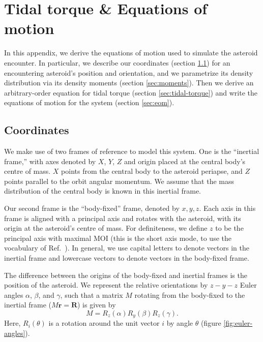 \appendix

\section{Tidal torque \& Equations of motion}
\label{app:eom}

In this appendix, we derive the equations of motion used to simulate the asteroid encounter. In particular, we describe our coordinates (section \ref{sec:coordinates}) for an encountering asteroid's position and orientation, and we parametrize its density distribution via its density moments (section \ref{sec:moments}). Then we derive an arbitrary-order equation for tidal torque (section \ref{sec:tidal-torque}) and write the equations of motion for the system (section \ref{sec:eom}).

\subsection{Coordinates}
\label{sec:coordinates}

We make use of two frames of reference to model this system. One is the ``inertial frame,'' with axes denoted by $\unit{X}$, $\unit{Y}$, $\unit{Z}$ and origin placed at the central body's centre of mass. $\unit{X}$ points from the central body to the asteroid periapse, and $\unit{Z}$ points parallel to the orbit angular momentum. We assume that the mass distribution of the central body is known in this inertial frame.

Our second frame is the ``body-fixed'' frame, denoted by $\unit{x}, \unit{y}, \unit{z}$. Each axis in this frame is aligned with a principal axis and rotates with the asteroid, with its origin at the asteroid's centre of mass. For definiteness, we define $\unit{z}$ to be the principal axis with maximal MOI (this is the short axis mode, to use the vocabulary of Ref.~\cite{kaasalainen2001interpretation}). In general, we use capital letters to denote vectors in the inertial frame and lowercase vectors to denote vectors in the body-fixed frame.

The difference between the origins of the body-fixed and inertial frames is the position of the asteroid. We represent the relative orientations by $z-y-z$ Euler angles $\alpha$, $\beta$, and $\gamma$, such that a matrix $M$ rotating from the body-fixed to the inertial frame ($M\bm{r} = \bm{R}$) is given by
\begin{equation}
M = R_z(\alpha) R_y(\beta) R_z(\gamma).
\label{eqn:euler-angles}
\end{equation}
Here, $R_i(\theta)$ is a rotation around the unit vector $i$ by angle $\theta$ (figure \ref{fig:euler-angles}).

